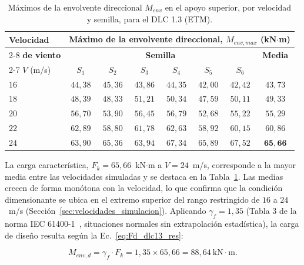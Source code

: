 \begin{table}[H]
    \centering
    \caption[Máximos del DLC 1.3 por velocidad y semilla.]{Máximos de la envolvente direccional $M_{env}$ en el apoyo superior, por velocidad y semilla, para el DLC 1.3 (ETM).}
    \label{tab:dlc13_maximos}
    \begin{tabular}{lccccccc}
        \hline
        \textbf{Velocidad} & \multicolumn{7}{c}{\textbf{Máximo de la envolvente direccional}, $M_{env,max}$ (kN$\cdot$m)} \\
        \cline{2-8}
        \textbf{de viento} & \multicolumn{6}{c}{\textbf{Semilla}} & \textbf{Media} \\
        \cline{2-7}
        $V$ (m/s) & $S_1$ & $S_2$ & $S_3$ & $S_4$ & $S_5$ & $S_6$ & \\
        \hline
        $16$ & $44{,}38$ & $45{,}36$ & $43{,}86$ & $44{,}35$ & $42{,}00$ & $42{,}42$ & $43{,}73$ \\
        $18$ & $48{,}39$ & $48{,}33$ & $51{,}21$ & $50{,}34$ & $47{,}59$ & $50{,}11$ & $49{,}33$ \\
        $20$ & $56{,}70$ & $53{,}90$ & $56{,}45$ & $56{,}79$ & $52{,}68$ & $55{,}22$ & $55{,}29$ \\
        $22$ & $62{,}89$ & $58{,}80$ & $61{,}78$ & $62{,}63$ & $58{,}92$ & $60{,}15$ & $60{,}86$ \\
        $24$ & $63{,}90$ & $65{,}36$ & $63{,}94$ & $67{,}34$ & $65{,}89$ & $67{,}52$ & $\mathbf{65{,}66}$ \\
        \hline
    \end{tabular}
\end{table}

La carga característica, $F_k = 65{,}66$~kN$\cdot$m a $V = 24$~m/s, corresponde a la mayor media entre las velocidades simuladas y se destaca en la Tabla~\ref{tab:dlc13_maximos}. Las medias crecen de forma monótona con la velocidad, lo que confirma que la condición dimensionante se ubica en el extremo superior del rango restringido de $16$ a $24$~m/s (Sección~\ref{sec:velocidades_simulacion}). Aplicando $\gamma_f = 1{,}35$ (Tabla 3 de la norma IEC 61400-1~\parencite*{IEC61400-1}, situaciones normales sin extrapolación estadística), la carga de diseño resulta según la Ec.~\ref{eq:Fd_dlc13_res}:

\begin{equation}
    M_{env,d} = \gamma_f \cdot F_k = 1{,}35 \times 65{,}66 = 88{,}64\ \text{kN}\cdot\text{m}.
    \label{eq:Fd_dlc13_res}
\end{equation}

